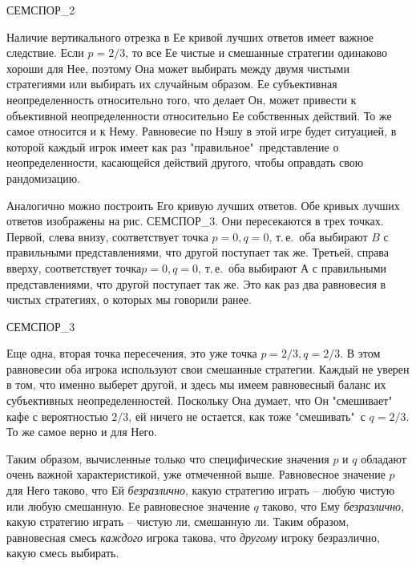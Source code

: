 \documentclass[12pt]{article}
\begin{document}
{СЕМСПОР_2

Наличие вертикального отрезка  в Ее кривой лучших ответов имеет важное следствие. Если
$p=2/3$, то все Ее чистые и смешанные стратегии одинаково хороши для Нее, поэтому Она
может выбирать между двумя чистыми стратегиями или выбирать их случайным образом.
Ее субъективная неопределенность относительно того, что делает Он, может привести к
объективной неопределенности относительно Ее собственных действий. То же самое относится и к Нему.
Равновесие по Нэшу в этой игре будет ситуацией, в которой каждый игрок имеет как раз
"правильное"\, представление о неопределенности, касающейся действий другого, чтобы
оправдать свою рандомизацию.

Аналогично можно построить Его кривую лучших ответов. Обе кривых лучших ответов изображены
на рис. СЕМСПОР_3. Они пересекаются в трех точках. Первой, слева внизу, соответствует точка
$p=0, q=0$, т.\,е.\, оба выбирают $B$ с правильными представлениями, что другой поступает так же.
Третьей, справа вверху, соответствует точка$p=0, q=0$, т.\,е.\, оба выбирают $А$ с
правильными представлениями, что другой поступает так же. Это как раз два равновесия в
чистых стратегиях, о которых мы говорили ранее.

СЕМСПОР_3

Еще одна, вторая точка пересечения, это уже точка $p=2/3, q=2/3$. В этом равновесии оба игрока
используют свои смешанные стратегии. Каждый не уверен в том, что именно выберет другой, и здесь
мы имеем равновесный баланс их субъективных неопределенностей. Поскольку Она думает, что Он
"смешивает"\, кафе с вероятностью $2/3$, ей ничего не остается, как тоже "смешивать"\, с
$q=2/3$. То же самое верно и для Него.


Таким образом, вычисленные только что специфические значения $p$ и $q$
обладают очень важной характеристикой, уже отмеченной выше.
Равновесное значение $p$ для Него таково,
что Ей \emph{безразлично}, какую стратегию играть -- любую чистую или любую
смешанную. Ее равновесное значение $q$ таково, что Ему \emph{безразлично},
какую стратегию играть -- чистую ли, смешанную ли. Таким образом,
равновесная смесь \emph{каждого} игрока такова, что \emph{другому}
игроку безразлично, какую смесь выбирать.

}
\end{document}
